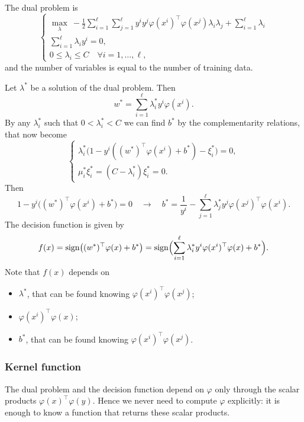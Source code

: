 The dual problem is
\begin{equation}
    \begin{cases}
        \displaystyle \max_{\lambda} \ -\frac{1}{2} \sum_{i=1}^{\ell} \sum_{j=1}^{\ell} y^i y^j \varphi(x^i)^\top \varphi(x^j) \lambda_i \lambda_j + \sum_{i=1}^{\ell} \lambda_i \\
        \displaystyle \sum_{i=1}^{\ell} \lambda_i y^i = 0, \\
        0 \le \lambda_i \le C \quad \forall i = 1, \dots, \ell,
    \end{cases}
    \label{eq:svm-nl-dual}
\end{equation}
and the number of variables is equal to the number of training data.

Let $\lambda^*$ be a solution of the dual problem. Then
\[
    w^* = \sum_{i=1}^{\ell} \lambda^*_i y^i \varphi(x^i).
\]
By any $\lambda^*_i$ such that $0 < \lambda^*_i < C$ we can find $b^*$ by the complementarity relations, that now become
\begin{equation}
    \begin{cases}
        \lambda^*_i \bigl(1 - y^i ((w^*)^\top \varphi(x^i) + b^*) - \xi^*_i\bigr) = 0, \\
        \mu^*_i \xi^*_i = (C - \lambda^*_i) \xi^*_i = 0.
    \end{cases}
    \label{eq:soft-compl-nl}
\end{equation}
Then
\[
    1 - y^i \bigl((w^*)^\top \varphi(x^i) + b^*\bigr) = 0 \quad \longrightarrow \quad b^* = \frac{1}{y^i} - \sum_{j=1}^{\ell} \lambda^*_j y^j \varphi(x^j)^\top \varphi(x^i).
\]
The decision function is given by
\[
    f(x) = \operatorname{sign}\bigl((w^*)^\top \varphi(x) + b^*\bigr) = \operatorname{sign}\Bigl(\sum_{i=1}^{\ell} \lambda^*_i y^i \varphi(x^i)^\top \varphi(x) + b^*\Bigr).
\]
Note that $f(x)$ depends on
\begin{itemize}
    \item $\lambda^*$, that can be found knowing $\varphi(x^i)^\top \varphi(x^j)$;
    \item $\varphi(x^i)^\top \varphi(x)$;
    \item $b^*$, that can be found knowing $\varphi(x^i)^\top \varphi(x^j)$.
\end{itemize}

\subsubsection{Kernel function}

The dual problem and the decision function depend on $\varphi$ only through the scalar products $\varphi(x)^\top\varphi(y)$. Hence we never need to compute $\varphi$ explicitly: it is enough to know a function that returns these scalar products.

